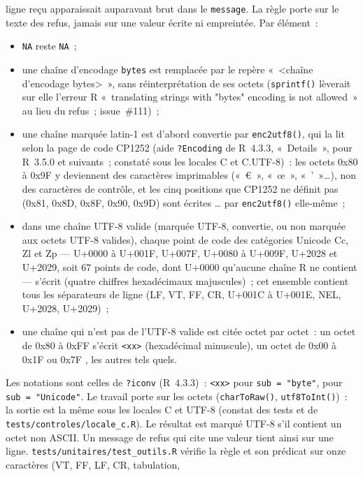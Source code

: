 \documentclass[a4paper,11pt]{article}
\newcommand{\code}[1]{\texttt{\small #1}}
\begin{document}
ligne reçu apparaissait auparavant brut dans le \code{message}. La règle
porte sur le texte des refus, jamais sur une valeur écrite ni empreintée.
Par élément~:
\begin{itemize}[leftmargin=*, itemsep=2pt]
  \item \code{NA} reste \code{NA}~;
  \item une chaîne d'encodage \code{bytes} est remplacée par le repère
    «~<chaîne d'encodage bytes>~», sans réinterprétation de ses octets
    (\code{sprintf()} lèverait sur elle l'erreur R «~translating strings
    with "bytes" encoding is not allowed~» au lieu du refus~; issue~\#111)~;
  \item une chaîne marquée latin-1 est d'abord convertie par
    \code{enc2utf8()}, qui la lit selon la page de code CP1252 (aide
    \code{?Encoding} de R~4.3.3, «~Details~», pour R~3.5.0 et suivants~;
    constaté sous les locales C et C.UTF-8)~: les octets 0x80 à 0x9F y
    deviennent des caractères imprimables («~€~», «~œ~», «~’~»\ldots), non
    des caractères de contrôle, et les cinq positions que CP1252 ne définit
    pas (0x81, 0x8D, 0x8F, 0x90, 0x9D) sont écrites \code{<81>}\ldots{} par
    \code{enc2utf8()} elle-même~;
  \item dans une chaîne UTF-8 valide (marquée UTF-8, convertie, ou non
    marquée aux octets UTF-8 valides), chaque point de code des catégories
    Unicode Cc, Zl et Zp --- U+0000 à U+001F, U+007F, U+0080 à U+009F,
    U+2028 et U+2029, soit 67 points de code, dont U+0000 qu'aucune
    chaîne R ne contient --- s'écrit \code{<U+XXXX>} (quatre chiffres
    hexadécimaux majuscules)~; cet ensemble contient tous les séparateurs
    de ligne (LF, VT, FF, CR, U+001C à U+001E, NEL, U+2028, U+2029)~;
  \item une chaîne qui n'est pas de l'UTF-8 valide est citée octet par
    octet~: un octet de 0x80 à 0xFF s'écrit \code{<xx>} (hexadécimal
    minuscule), un octet de 0x00 à 0x1F ou 0x7F \code{<U+00XX>}, les autres
    tels quels.
\end{itemize}
Les notations sont celles de \code{?iconv} (R~4.3.3)~: \code{<xx>} pour
\code{sub = "byte"}, \code{<U+xxxx>} pour \code{sub = "Unicode"}. Le travail
porte sur les octets (\code{charToRaw()}, \code{utf8ToInt()})~: la sortie
est la même sous les locales C et UTF-8 (constat des tests et de
\code{tests/controles/locale\_c.R}). Le résultat est marqué UTF-8 s'il
contient un octet non ASCII. Un message de refus qui cite une valeur tient
ainsi sur une ligne. \code{tests/unitaires/test\_outils.R} vérifie la
règle et son prédicat sur onze caractères (VT, FF, LF, CR, tabulation,
\end{document}
